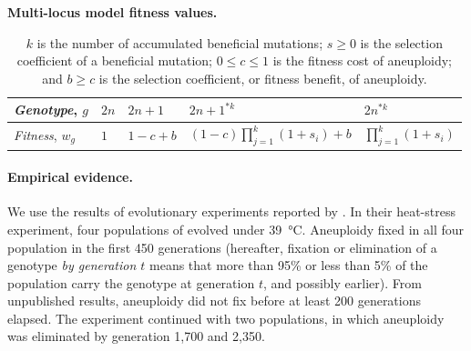 \documentclass[12pt]{extarticle}
\begin{document}
\begin{table}[h]
\centering
\caption{\textbf{Multi-locus model fitness values.}}
\begin{tabular}{lllll}
\emph{Genotype}, $g$ & $2n$ & $2n+1$ & $2n+1^{*k}$ & $2n^{*k}$ \\
\hline
\emph{Fitness}, $w_g$ & $1$ & $1-c+b$ & $(1-c)\prod_{j=1}^k(1+s_i)+b$ & $\prod_{j=1}^k(1+s_i)$               
\end{tabular}
\label{table:multi-locus}
\caption*{
$k$ is the number of accumulated beneficial mutations;
$s \ge 0$ is the selection coefficient of a beneficial mutation;
$0 \le c \le 1$ is the fitness cost of aneuploidy;
and $b \ge c$ is the selection coefficient, or fitness benefit, of aneuploidy.
}
\end{table}

\paragraph{Empirical evidence.}

We use the results of evolutionary experiments reported by \citet{Yona2012}.
In their heat-stress experiment, four populations of \yeast evolved under \SI{39}{\celsius}. Aneuploidy fixed in all four population in the first 450 generations (hereafter, fixation or elimination of a genotype \emph{by generation $t$} means that more than 95\% or less than 5\% of the population carry the genotype at generation $t$, and possibly earlier). From unpublished results, aneuploidy did not fix before at least 200 generations elapsed.
The experiment continued with two populations, in which aneuploidy was eliminated by generation 1,700 and 2,350.
\end{document}
